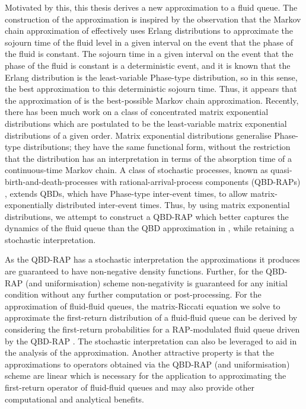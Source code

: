Motivated by this, this thesis derives a new approximation to a fluid queue. The construction of the approximation is inspired by the observation that the Markov chain approximation of \cite{bo2013} effectively uses Erlang distributions to approximate the sojourn time of the fluid level in a given interval on the event that the phase of the fluid is constant. The sojourn time in a given interval on the event that the phase of the fluid is constant is a deterministic event, and it is known that the Erlang distribution is the least-variable Phase-type distribution, so in this sense, the best approximation to this deterministic sojourn time. Thus, it appears that the approximation of \cite{bo2013} is the best-possible Markov chain approximation. Recently, there has been much work on a class of concentrated matrix exponential distributions \citep{hhat2020} which are postulated to be the least-variable matrix exponential distributions of a given order. Matrix exponential distributions generalise Phase-type distributions; they have the same functional form, without the restriction that the distribution has an interpretation in terms of the absorption time of a continuous-time Markov chain. A class of stochastic processes, known as quasi-birth-and-death-processes with rational-arrival-process components (QBD-RAPs) \citep{bn2010}, extends QBDs, which have Phase-type inter-event times, to allow matrix-exponentially distributed inter-event times. Thus, by using matrix exponential distributions, we attempt to construct a QBD-RAP which better captures the dynamics of the fluid queue than the QBD approximation in \cite{bo2013}, while retaining a stochastic interpretation. 

As the QBD-RAP has a stochastic interpretation the approximations it produces are guaranteed to have non-negative density functions. Further, for the QBD-RAP (and uniformisation) scheme non-negativity is guaranteed for any initial condition without any further computation or post-processing. For the approximation of fluid-fluid queues, the matrix-Riccati equation we solve to approximate the first-return distribution of a fluid-fluid queue can be derived by considering the first-return probabilities for a RAP-modulated fluid queue driven by the QBD-RAP \citep{p2019,bgnp2021}. The stochastic interpretation can also be leveraged to aid in the analysis of the approximation. Another attractive property is that the approximations to operators obtained via the QBD-RAP (and uniformisation) scheme are linear which is necessary for the application to approximating the first-return operator of fluid-fluid queues and may also provide other computational and analytical benefits. 


